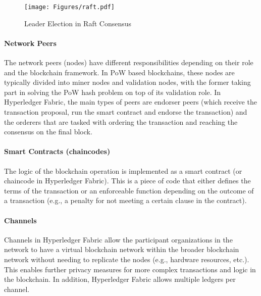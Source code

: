 \begin{figure}
    \centering
    \texttt{[image: Figures/raft.pdf]}
    \caption{Leader Election in Raft Consensus}
    \label{fig:raft}
\end{figure}

\paragraph{Network Peers}
The network peers (nodes) have different responsibilities depending on their role and the blockchain framework. In \ac{PoW} based blockchains, these nodes are typically divided into miner nodes and validation nodes, with the former taking part in solving the \ac{PoW} hash problem on top of its validation role. In Hyperledger Fabric, the main types of peers are endorser peers (which receive the transaction proposal, run the smart contract and endorse the transaction) and the orderers that are tasked with ordering the transaction and reaching the consensus on the final block.
\paragraph{Smart Contracts (chaincodes)}
The logic of the blockchain operation is implemented as a smart contract (or chaincode in Hyperledger Fabric). This is a piece of code that either defines the terms of the transaction or an enforceable function depending on the outcome of a transaction (e.g., a penalty for not meeting a certain clause in the contract). %
\paragraph{Channels}
Channels in Hyperledger Fabric allow the participant organizations in the network to have a virtual blockchain network within the broader blockchain network without needing to replicate the nodes (e.g., hardware resources, etc.). This enables further privacy measures for more complex transactions and logic in the blockchain. In addition, Hyperledger Fabric allows multiple ledgers per channel.







